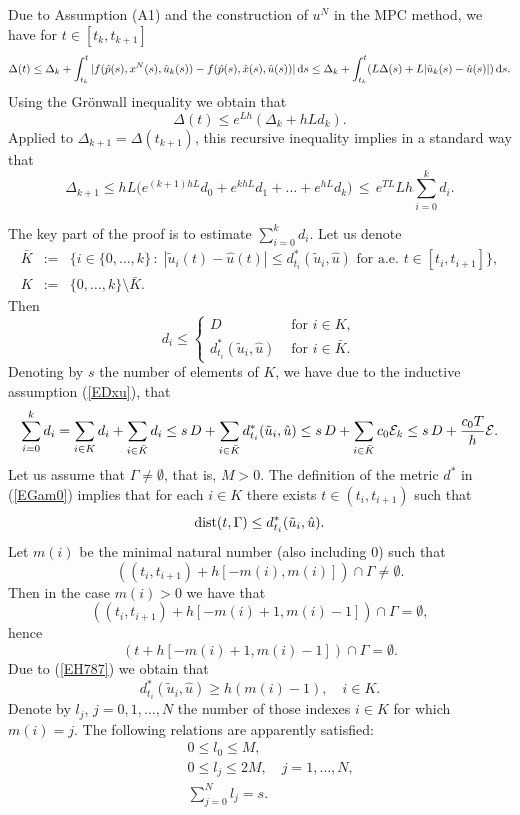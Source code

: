 \documentclass[11pt]{article}
\newcommand{\bd}{\begin{displaymath}}
\newcommand{\ed}{\end{displaymath}}
\newcommand{\be}{\begin{equation}}
\newcommand{\ee}{\end{equation}}
\newcommand{\bea}{\begin{eqnarray}}
\newcommand{\eea}{\end{eqnarray}}
\newcommand{\bda}{\begin{eqnarray*}}
\newcommand{\eda}{\end{eqnarray*}}
\newcommand{\di}{\mbox{\rm dist}}
\newcommand{\E}{{\cal E}}
\newcommand{\sth}{ \, :\;}
\newcommand{\dd}{\mbox{\rm\,d}}
\newcommand{\tu}{{\tilde u}}
\newcommand{\hu}{{\hat u}}
\begin{document}
Due to Assumption (A1) and the construction of
$u^N$ in the MPC method, we have for $t \in [t_k,t_{k+1}]$
\bd
      \Delta(t)  \leq \Delta_k + \int_{t_k}^t | f(\hat p(s), x^N(s), \tilde u_k(s)) -   f(\hat p(s), \hat x(s), \hu(s)) | \dd s
      \leq \Delta_k + \int_{t_k}^t (L \Delta(s) + L | \tu_k(s) - \hu(s)|) \dd s.
\ed
Using the Gr\"{o}nwall inequality we obtain that 
\bd
            \Delta(t) \leq e^{Lh} (\Delta_k + hLd_k).
\ed
Applied to $\Delta_{k+1} = \Delta(t_{k+1})$, this recursive inequality implies in a standard way that 
\be \label{EDel_k}
             \Delta_{k+1} \leq hL\Big(e^{(k+1)hL} d_0 + e^{khL} d_1 + \ldots + e^{hL} d_{k} \Big) 
                    \,\leq \, e^{TL} L h \sum_{i=0}^{k} d_i.
\ee
 
The key part of the proof is to estimate $\sum_{i=0}^{k} d_i$. Let us denote
\bda
       \bar K &:=& \{i \in \{0, \ldots, k \} \sth | \tu_i (t) - \hu(t) | \leq d^*_{t_i}(\tu_i, \hu) 
           \mbox{ for a.e. } t \in [t_i, t_{i+1}] \}, \\
          K & := & \{ 0, \ldots, k\} \setminus \bar K.
\eda
Then
\be \label{EH12}
          d_i \leq \left\{ \begin{array}{cl}
                               D & \mbox{ for } i \in K, \\
                               d_{t_i}^*(\tilde u_i,  \hat u) & \mbox{ for } i \in \bar K.
                 \end{array} \right.
\ee
Denoting by $s$ the number of elements of $K$, we have due to the inductive assumption (\ref{EDxu}), that
\be \label{EH75}
    \sum_{i=0}^{k} d_i =  \sum_{i \in K} d_i + \sum_{i \in \bar K} d_i \leq 
                   s \, D + \sum_{i \in \bar K} d^*_{t_i}(\tu_i, \hu) \leq s \, D + \sum_{i \in \bar K} c_0 \E_k
             \leq s \, D +  \frac{c_0 T}{h} \E .
\ee
Let us assume that $\Gamma \not= \emptyset$, that is, $M > 0$.
The definition of the metric $d^*$ in (\ref{EGam0}) implies that for each $i \in K$ there exists 
$t \in (t_i, t_{i+1})$ such that 
\be \label{EH787} 
         \di(t, \Gamma) \leq d^*_{t_i}(\tu_i, \hu).
\ee
Let $m(i)$ be the minimal natural number (also including $0$) such that 
\bd
         \left( (t_i, t_{i+1})  + h [ -m(i), m(i) ] \right) \cap \Gamma \not= \emptyset.
\ed
Then in the case $m(i) > 0$ we have that 
\bd
         \left( (t_i, t_{i+1})  + h [ -m(i)+1, m(i) - 1 ] \right) \cap \Gamma = \emptyset,
\ed
hence
\bd
         \left( t + h [ -m(i)+1,m(i) - 1 ] \right) \cap \Gamma = \emptyset.
\ed
Due to (\ref{EH787}) we obtain that 
\be \label{Ed_m}
           d^*_{t_i}(\tu_i, \hu) \geq  h (m(i) - 1 ), \quad i \in K.
\ee
Denote by $l_j$, $j = 0, 1, \ldots, N$ the number of those indexes $i \in K$ for which $m(i) = j$. The following relations 
are apparently satisfied:
\bea \nonumber
              && 0 \leq l_0 \leq M, \\
              && 0 \leq l_j \leq 2M, \quad j = 1, \ldots, N,  \label{Elj} \\
               && \sum_{j=0}^N l_j = s.  \nonumber
\eea 
\end{document}
